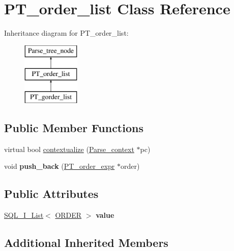 \hypertarget{classPT__order__list}{}\section{P\+T\+\_\+order\+\_\+list Class Reference}
\label{classPT__order__list}
Inheritance diagram for P\+T\+\_\+order\+\_\+list\+:\begin{figure}[H]
\begin{center}
\leavevmode
\includegraphics[height=3.000000cm]{classPT__order__list}
\end{center}
\end{figure}
\subsection*{Public Member Functions}
\begin{DoxyCompactItemize}
\item 
virtual bool \mbox{\hyperlink{classPT__order__list_a04039b92b0e1bd5d37f1975459e7b9b6}{contextualize}} (\mbox{\hyperlink{structParse__context}{Parse\+\_\+context}} $\ast$pc)
\item 
\mbox{\label{classPT__order__list_a0f9db1902aba2798d88399670547126f}} 
void {\bfseries push\+\_\+back} (\mbox{\hyperlink{classPT__order__expr}{P\+T\+\_\+order\+\_\+expr}} $\ast$order)
\end{DoxyCompactItemize}
\subsection*{Public Attributes}
\begin{DoxyCompactItemize}
\item 
\mbox{\label{classPT__order__list_ad776fda2266c774ba9911155eac0ff29}} 
\mbox{\hyperlink{classSQL__I__List}{S\+Q\+L\+\_\+\+I\+\_\+\+List}}$<$ \mbox{\hyperlink{structst__order}{O\+R\+D\+ER}} $>$ {\bfseries value}
\end{DoxyCompactItemize}
\subsection*{Additional Inherited Members}


